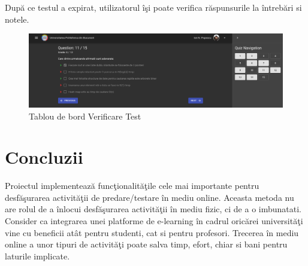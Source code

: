 \documentclass[12pt, a4paper, oneside, romanian]{teza-upb}
\begin{document}
După ce testul a expirat, utilizatorul îşi poate verifica răspunsurile la întrebări si notele.

\begin{figure}[H]
\centering
\includegraphics*[width=\columnwidth]{tablou-de-bord-verificare-test}
\caption{Tablou de bord Verificare Test}
\label{tablou-de-bord-verificare-test}
\end{figure}




\chapter*{Concluzii}

Proiectul implementează funcţionalităţile cele mai importante pentru desfăşurarea activităţii de predare/testare în mediu online. Aceasta metoda nu are rolul de a înlocui desfăşurarea activităţii în mediu fizic, ci de a o imbunatati. Consider ca integrarea unei platforme de e-learning în cadrul oricărei universităţi vine cu beneficii atât pentru studenti, cat si pentru profesori. Trecerea în mediu online a unor tipuri de activităţi poate salva timp, efort, chiar si bani pentru laturile implicate.





\end{document}
